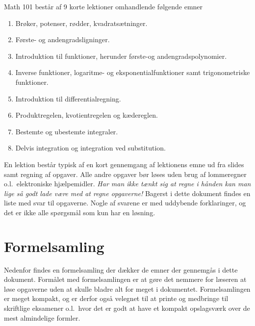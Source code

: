 Math 101 består af 9 korte lektioner omhandlende følgende emner 
\begin{enumerate}
    \item Brøker, potenser, rødder, kvadratsætninger.
    \item Første- og andengradsligninger.
    \item Introduktion til funktioner, herunder første-og andengradspolynomier.
    \item Inverse funktioner, logaritme- og eksponentialfunktioner samt trigonometriske funktioner.
    \item Introduktion til differentialregning.
    \item Produktregelen, kvotientregelen og kædereglen.
    \item Bestemte og ubestemte integraler.
    \item Delvis integration og integration ved substitution.
\end{enumerate}
En lektion består typisk af en kort gennemgang af lektionens emne ud fra slides samt regning af opgaver. Alle andre opgaver bør løses uden brug af lommeregner o.l.\ elektroniske hjælpemidler. \emph{Har man ikke tænkt sig at regne i hånden kan man lige så godt lade være med at regne opgaverne!} Bagerst i dette dokument findes en liste med svar til opgaverne. Nogle af svarene er med uddybende forklaringer, og det er ikke alle spørgsmål som kun har en løsning.


\pagestyle{fancy}
\chapter{Formelsamling}
Nedenfor findes en formelsamling der dækker de emner der gennemgås i dette dokument. Formålet med formelsamlingen er at gøre det nemmere for læseren at løse opgaverne uden at skulle bladre alt for meget i dokumentet. Formelsamlingen er meget kompakt, og er derfor også velegnet til at printe og medbringe til skriftlige eksamener o.l.\ hvor det er godt at have et kompakt opslagsværk over de mest almindelige formler.
{ 
    \fontsize{8pt}{0.5pt}\selectfont
    \setlength{\abovedisplayskip}{1pt}
    \setlength{\belowdisplayskip}{1pt}
    \pagestyle{empty}
    \setlength{\parindent}{0pt}
    \small
    \begin{multicols*}{3}
        
        
        
        
        
        \phantom{asdfjæasdjfæsalkdjfælsadjfælksadjfælksadjfælkadsjfælksadjfælsakdjfælsakdjfælsakdjfælksadjfælakdsjfældsakjfæl}
        \vfill
    \end{multicols*}
    }
\restoregeometry
{}
